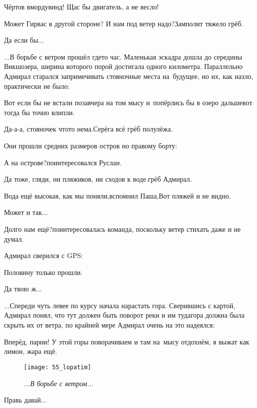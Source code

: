 \diagdash Чёртов вмордувинд! Щас бы двигатель, а не весло!

\diagdash Может Гирвас в другой стороне? И нам под ветер надо?\mdash Замполит тяжело грёб.

\diagdash Да если бы$\ldots$

\vspace{0.75em}
$\ldots$В борьбе с ветром прошёл где\sdash то час. Маленькая эскадра дошла до середины Викшозера, ширина которого порой достигала одного километра. Параллельно Адмирал старался запримечивать стояночные места на~будущее, но их, как назло, практически не было:

\diagdash Вот если бы не встали позавчера на том мысу и~попёрлись бы в озеро дальше\mdash вот тогда бы точно влипли.

\diagdash Да-а-а, стояночек что\sdash то нема.\mdash Серёга всё грёб полулёжа.

Они прошли средних размеров остров но правому борту:

\diagdash А на острове?\mdash поинтересовался Руслан.

\diagdash Да тоже, гляди, ни пляжиков, ни сходов к воде.\mdash грёб Адмирал.

\diagdash Вода ещё высокая, как мы поняли,\mdash вспомнил Паша,\mdash Вот пляжей и не видно.

\diagdash Может и так$\ldots$

\diagdash Долго нам ещё?\mdash поинтересовалась команда, поскольку ветер стихать даже и не думал.

Адмирал сверился с GPS:

\diagdash Половину только прошли.

\diagdash Да твою ж$\ldots$

\vspace{1em}
$\ldots$Спереди чуть левее по курсу начала нарастать гора. Сверившись с картой, Адмирал понял, что тут должен быть поворот реки и им туда\mdash гора должна была скрыть их от ветра, по крайней мере Адмирал очень на это надеялся:

\diagdash Вперёд, парни! У этой горы поворачиваем и там на~мысу отдохнём, я выжат как лимон, жара ещё.

\begin{wrapfigure}[15]{l}{0.58\textwidth}
	\centering
	\texttt{[image: 55\_lopatim]}
	\caption{\small\textit{...В борьбе с ветром...}}
\end{wrapfigure}
\diagdash Правь давай$\ldots$


